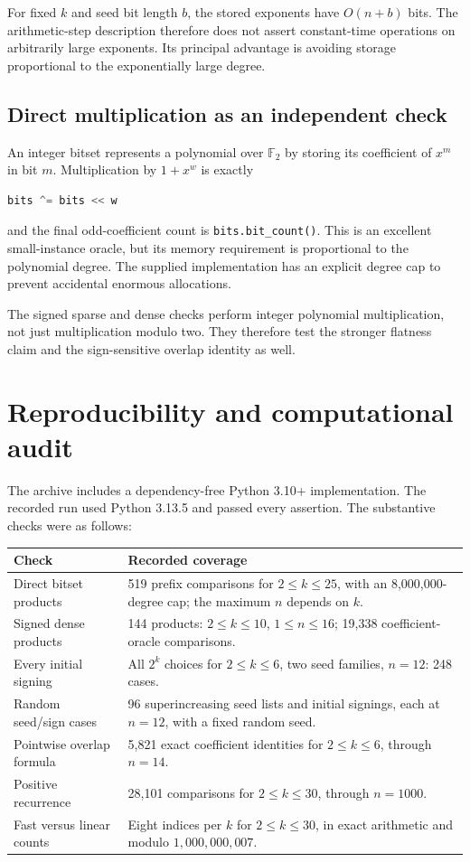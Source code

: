 \documentclass[11pt]{article}
\numberwithin{equation}{section}
\theoremstyle{definition}
\theoremstyle{remark}
\newcommand{\F}{\mathbb F}
\begin{document}
For fixed $k$ and seed bit length $b$, the stored exponents have
$O(n+b)$ bits. The arithmetic-step description therefore does not assert
constant-time operations on arbitrarily large exponents. Its principal
advantage is avoiding storage proportional to the exponentially large degree.

\subsection{Direct multiplication as an independent check}
An integer bitset represents a polynomial over $\F_2$ by storing its
coefficient of $x^m$ in bit $m$. Multiplication by $1+x^w$ is exactly
\begin{lstlisting}[language=Python]
bits ^= bits << w
\end{lstlisting}
and the final odd-coefficient count is \texttt{bits.bit\_count()}.
This is an excellent small-instance oracle, but its memory requirement is
proportional to the polynomial degree. The supplied implementation has an
explicit degree cap to prevent accidental enormous allocations.

The signed sparse and dense checks perform integer polynomial multiplication,
not just multiplication modulo two. They therefore test the stronger
flatness claim and the sign-sensitive overlap identity as well.

\section{Reproducibility and computational audit}
The archive includes a dependency-free Python 3.10+ implementation. The
recorded run used Python 3.13.5 and passed every assertion. The substantive
checks were as follows:
\begin{center}
\begin{tabular}{@{}p{}p{}@{}}
\toprule
Check & Recorded coverage\\
\midrule
Direct bitset products & 519 prefix comparisons for $2\le k\le25$, with
an 8,000,000-degree cap; the maximum $n$ depends on $k$.\\
Signed dense products & 144 products: $2\le k\le10$, $1\le n\le16$;
19,338 coefficient-oracle comparisons.\\
Every initial signing & All $2^k$ choices for $2\le k\le6$, two seed
families, $n=12$: 248 cases.\\
Random seed/sign cases & 96 superincreasing seed lists and initial
signings, each at $n=12$, with a fixed random seed.\\
Pointwise overlap formula & 5,821 exact coefficient identities for
$2\le k\le6$, through $n=14$.\\
Positive recurrence & 28,101 comparisons for $2\le k\le30$, through
$n=1000$.\\
Fast versus linear counts & Eight indices per $k$ for $2\le k\le30$,
in exact arithmetic and modulo $1,000,000,007$.\\
\bottomrule
\end{tabular}
\end{center}
\end{document}
